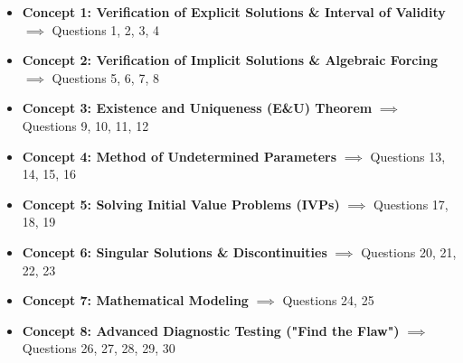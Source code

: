 \documentclass[12pt]{article}
\begin{document}
\begin{itemize}
    \item \textbf{Concept 1: Verification of Explicit Solutions \& Interval of Validity} $\implies$ Questions 1, 2, 3, 4
    \item \textbf{Concept 2: Verification of Implicit Solutions \& Algebraic Forcing} $\implies$ Questions 5, 6, 7, 8
    \item \textbf{Concept 3: Existence and Uniqueness (E\&U) Theorem} $\implies$ Questions 9, 10, 11, 12
    \item \textbf{Concept 4: Method of Undetermined Parameters} $\implies$ Questions 13, 14, 15, 16
    \item \textbf{Concept 5: Solving Initial Value Problems (IVPs)} $\implies$ Questions 17, 18, 19
    \item \textbf{Concept 6: Singular Solutions \& Discontinuities} $\implies$ Questions 20, 21, 22, 23
    \item \textbf{Concept 7: Mathematical Modeling} $\implies$ Questions 24, 25
    \item \textbf{Concept 8: Advanced Diagnostic Testing ("Find the Flaw")} $\implies$ Questions 26, 27, 28, 29, 30
\end{itemize}
\end{document}
